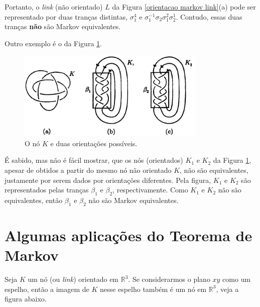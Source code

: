 \begin{remark}
		\par\vspace{0.3cm} Portanto, o \textit{link} (não orientado) $L$ da 
		Figura \ref{orientacao markov link}(a) pode ser representado por duas tranças distintas, 
		$\sigma_1^4$ e $\sigma_1^{-1}\sigma_2\sigma_1^{2}\sigma_2^{1}$. Contudo, essas duas 
		tranças \textbf{não} são Markov equivalentes.
		
		\par\vspace{0.3cm} Outro exemplo é o da Figura \ref{orientacao markov no}.
		\begin{figure}[H]
			\begin{center}
				\includegraphics[width=9cm]{Images/orientacao_markov_no.png}
			\end{center}\caption{O nó $K$ e duas orientações possíveis.}\label{orientacao markov no}
		\end{figure}
		É sabido, mas não é fácil mostrar, que os nós (orientados) $K_1$ e $K_2$ da 
		Figura \ref{orientacao markov no}, apesar de obtidos a partir do mesmo nó não 
		orientado $K$, não são equivalentes, justamente por serem dados por orientações 
		diferentes. Pela figura, $K_1$ e $K_2$ são representados pelas tranças $\beta_1$ e $\beta_2$,
		respectivamente. Como $K_1$ e $K_2$ não são equivalentes, então $\beta_1$ e $\beta_2$ 
		não são Markov equivalentes.  
	\end{remark}
	\section{Algumas aplicações do Teorema de Markov}
	\hspace{12pt} Seja $K$ um nó (ou \textit{link}) orientado em $\mathbb{R}^3$. Se considerarmos o plano $xy$ como um espelho, então a imagem de $K$ nesse espelho também é um nó em $\mathbb{R}^3$, veja a figura abaixo.
	
